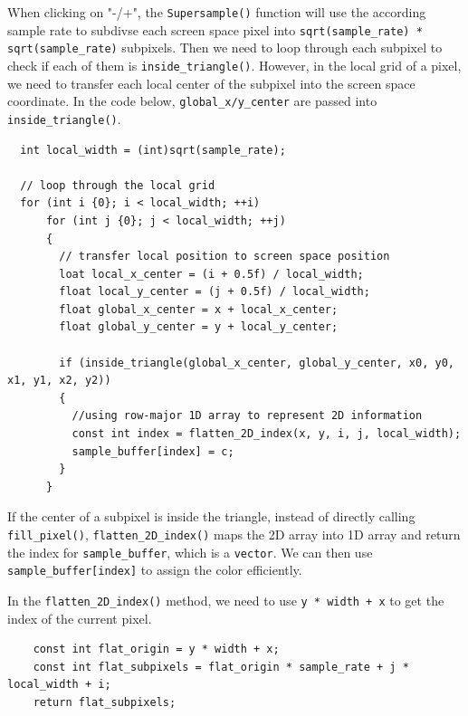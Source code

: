 \documentclass[11pt]{article}
\begin{document}
When clicking on "-/+", the \texttt{Supersample()} function will use
the according sample rate to subdivse each screen space pixel into
\texttt{sqrt(sample\_rate) * sqrt(sample\_rate)} subpixels. Then we need to
loop through each subpixel to check if each of them is \texttt{inside\_triangle()}.
However, in the local grid of a pixel, we need to transfer each local center of the subpixel
into the screen space coordinate. In the code below, \texttt{global\_x/y\_center}
are passed into \texttt{inside\_triangle()}.
\begin{verbatim}    
  int local_width = (int)sqrt(sample_rate);

  // loop through the local grid
  for (int i {0}; i < local_width; ++i)
      for (int j {0}; j < local_width; ++j)
      {
        // transfer local position to screen space position
        loat local_x_center = (i + 0.5f) / local_width;
        float local_y_center = (j + 0.5f) / local_width;
        float global_x_center = x + local_x_center;
        float global_y_center = y + local_y_center;

        if (inside_triangle(global_x_center, global_y_center, x0, y0, x1, y1, x2, y2))
        {
          //using row-major 1D array to represent 2D information
          const int index = flatten_2D_index(x, y, i, j, local_width);
          sample_buffer[index] = c;
        }
      }
\end{verbatim}

If the center of a subpixel is inside the triangle, instead of directly calling
\texttt{fill\_pixel()}, \texttt{flatten\_2D\_index()} maps the 2D array into 1D array
and return the index for \texttt{sample\_buffer}, which is a \texttt{vector}.
We can then use \texttt{sample\_buffer[index]} to assign the color efficiently.

In the \texttt{flatten\_2D\_index()} method, we need to use \texttt{y * width + x}
to get the index of the current pixel. 
\begin{verbatim}    
    const int flat_origin = y * width + x;
    const int flat_subpixels = flat_origin * sample_rate + j * local_width + i;
    return flat_subpixels;
\end{verbatim}
\end{document}

